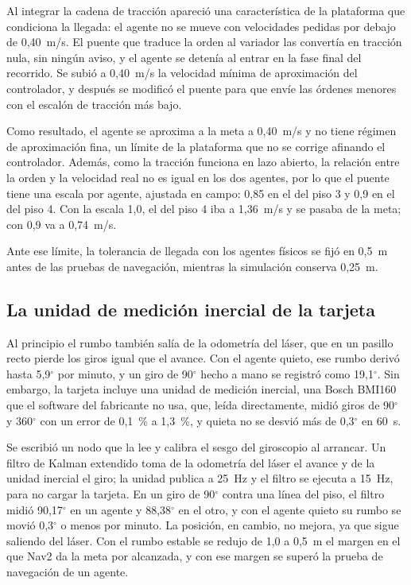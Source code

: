 Al integrar la cadena de tracción apareció una característica de la plataforma que condiciona la llegada: el agente no se mueve con velocidades pedidas por debajo de 0,40~m/s. El puente que
traduce la orden al variador las convertía en tracción nula, sin ningún aviso, y el agente se detenía al entrar en la fase final del recorrido. Se subió a 0,40~m/s la velocidad
mínima de aproximación del controlador, y después se modificó el puente para que envíe las órdenes menores con el escalón de tracción más bajo.

Como resultado, el agente se aproxima a la meta a 0,40~m/s y no tiene régimen de aproximación fina, un límite de la plataforma que no se corrige afinando el controlador. Además, como la
tracción funciona en lazo abierto, la relación entre la orden y la velocidad real no es igual en los dos agentes, por lo que el puente tiene una escala por agente, ajustada en campo: 0,85
en el del piso 3 y 0,9 en el del piso 4. Con la escala 1,0, el del piso 4 iba a 1,36~m/s y se pasaba de la meta; con 0,9 va a 0,74~m/s.

Ante ese límite, la tolerancia de llegada con los agentes físicos se fijó en 0,5~m antes de las pruebas de navegación, mientras la simulación conserva 0,25~m.

\subsection{La unidad de medición inercial de la tarjeta}
\label{sec:imu}

Al principio el rumbo también salía de la odometría del láser, que en un pasillo recto pierde los giros igual que el avance. Con el agente quieto, ese rumbo derivó hasta 5,9$^\circ$ por minuto,
y un giro de 90$^\circ$ hecho a mano se registró como 19,1$^\circ$. Sin embargo, la tarjeta incluye una unidad de medición inercial, una Bosch BMI160 que el software del fabricante no usa, que,
leída directamente, midió giros de 90$^\circ$ y 360$^\circ$ con un error de 0,1~\% a 1,3~\%, y quieta no se desvió más de 0,3$^\circ$ en 60~s.

Se escribió un nodo que la lee y calibra el sesgo del giroscopio al arrancar. Un filtro de Kalman extendido toma de la odometría del láser el avance y de la unidad inercial el giro; la unidad
publica a 25~Hz y el filtro se ejecuta a 15~Hz, para no cargar la tarjeta. En un giro de 90$^\circ$ contra una línea del piso, el filtro midió 90,17$^\circ$ en un agente y 88,38$^\circ$ en el otro, y
con el agente quieto su rumbo se movió 0,3$^\circ$ o menos por minuto. La posición, en cambio, no mejora, ya que sigue saliendo del láser. Con el rumbo estable se redujo de 1,0 a 0,5~m el margen en
el que Nav2 da la meta por alcanzada, y con ese margen se superó la prueba de navegación de un agente.

